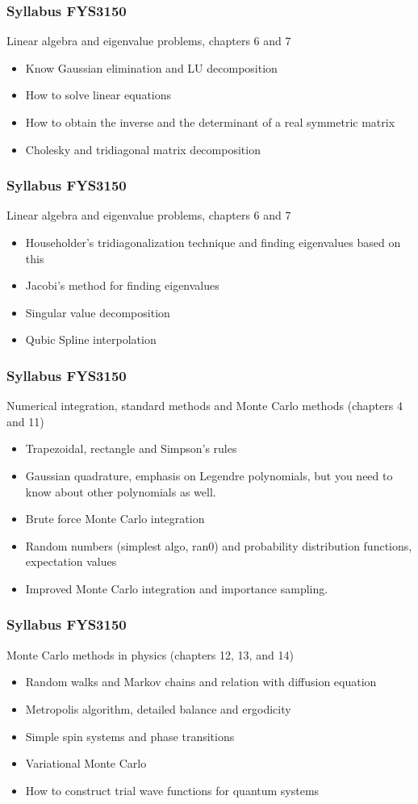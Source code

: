 \documentclass[compress]{beamer}
\begin{document}
\frame
{
  \frametitle{Syllabus FYS3150}
  \begin{block}{Linear algebra and eigenvalue problems, chapters 6 and 7}
\begin{itemize}
\item Know Gaussian elimination and LU decomposition
\item How to solve linear equations
\item How to obtain the inverse and the determinant of a real symmetric matrix
\item Cholesky and tridiagonal matrix decomposition
\end{itemize}
  \end{block}
}




\frame
{
  \frametitle{Syllabus FYS3150}
  \begin{block}{Linear algebra and eigenvalue problems, chapters 6 and 7}
\begin{itemize}
\item Householder's tridiagonalization technique and finding eigenvalues based on this
\item Jacobi's method for finding eigenvalues
\item Singular value decomposition
\item Qubic Spline interpolation
\end{itemize}
  \end{block}
}




\frame
{
  \frametitle{Syllabus FYS3150}
  \begin{block}{Numerical integration, standard methods and Monte Carlo methods (chapters 4 and 11)}
\begin{itemize}
\item Trapezoidal, rectangle  and Simpson's rules
\item Gaussian quadrature, emphasis on Legendre polynomials, but you need
to know about other polynomials as well.
\item Brute force Monte Carlo integration
\item Random numbers (simplest algo, ran0) and probability distribution functions, expectation values
\item Improved Monte Carlo integration and importance sampling.
\end{itemize}
  \end{block}
}


\frame
{
  \frametitle{Syllabus FYS3150}
  \begin{block}{Monte Carlo methods in physics (chapters 12, 13, and 14)}
\begin{itemize}
\item Random walks and Markov chains and relation with diffusion equation
\item Metropolis algorithm, detailed balance and ergodicity
\item Simple spin systems and phase transitions
\item Variational Monte Carlo
\item How to construct trial wave functions for quantum systems
\end{itemize}
  \end{block}
}
\end{document}
